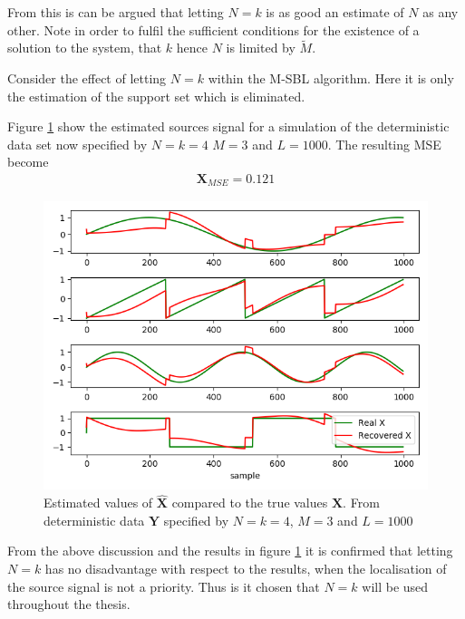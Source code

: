From this is can be argued that letting $N = k$ is as good an estimate of $N$ as any other. Note in order to fulfil the sufficient conditions for the existence of a solution to the system, that $k$ hence $N$ is limited by $\widetilde{M}$.     

Consider the effect of letting $N = k$ within the M-SBL algorithm. Here it is only the estimation of the support set which is eliminated.   

Figure \ref{fig:M-SBL_simple3} show the estimated sources signal for a simulation of the deterministic data set now specified by $N=k=4$ $M = 3$ and $L=1000$. The resulting MSE become
\begin{align*}
\textbf{X}_{MSE} = 0.121
\end{align*}

\begin{figure}[H]
\centering
\includegraphics[scale=0.5]{figures/ch_6/M-SBL_simple3.png}
\caption{Estimated values of $\hat{\textbf{X}}$ compared to the true 				values $\textbf{X}$. From deterministic data $\textbf{Y}$ specified by $N=k=4$, $M = 3$ and $L=1000$ }
\label{fig:M-SBL_simple3}
\end{figure}

From the above discussion and the results in figure \ref{fig:M-SBL_simple3} it is confirmed that letting $N=k$ has no disadvantage with respect to the results, when the localisation of the source signal is not a priority. Thus is it chosen that $N=k$ will be used throughout the thesis. 

